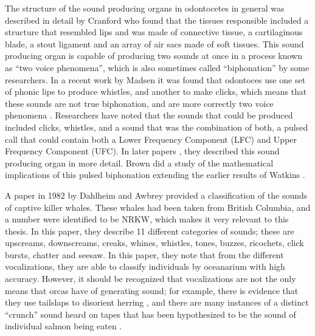 The structure of the sound producing organs in odontocetes in general
was described in detail by Cranford \cite{cranford1996morphology} who
found that the tissues responsible included a structure that resembled
lips and was made of connective tissue, a cartilaginous blade, a stout
ligament and an array of air sacs made of soft tissues.  This sound
producing organ is capable of producing two sounds at once in a
process known as ``two voice phenomena'', which is also sometimes
called ``biphonation'' by some researchers.  In a recent work by
Madsen \cite{madsen2013nasal} it was found that odontoces use one set
of phonic lips to produce whistles, and another to make clicks, which
means that these sounds are not true biphonation, and are more
correctly two voice phenomena \cite{wilden1998subharmonics}.
Researchers have noted that the sounds that could be produced included
clicks, whistles, and a sound that was the combination of both, a
pulsed call that could contain both a Lower Frequency Component (LFC)
and Upper Frequency Component (UFC).  In later papers
\cite{cranford2000impulse} \cite{cranford2006nasalizations}, they
described this sound producing organ in more detail.  Brown
\cite{brown2008math} did a study of the mathematical implications of
this pulsed biphonation extending the earlier results of Watkins
\cite{watkins1967harmonic}.

A paper in 1982 by Dahlheim and Awbrey
\cite{dahlheim1982classification} provided a classification of the
sounds of captive killer whales.  These whales had been taken from
British Columbia, and a number were identified to be NRKW, which makes it very relevant to this thesis.  In
this paper, they describe 11 different categories of sounds; these are
upscreams, downscreams, creaks, whines, whistles, tones, buzzes,
ricochets, click bursts, chatter and seesaw.  In this paper, they note
that from the different vocalizations, they are able to classify
individuals by oceanarium with high accuracy.  However, it should be
recognized that vocalizations are not the only means that orcas have
of generating sound; for example, there is evidence that they use
tailslaps to disorient herring \cite{simon2005tailslap}, and there are
many instances of a distinct ``crunch'' sound heard on tapes that has
been hypothesized to be the sound of individual salmon being eaten
\cite{helena2012interview}.

